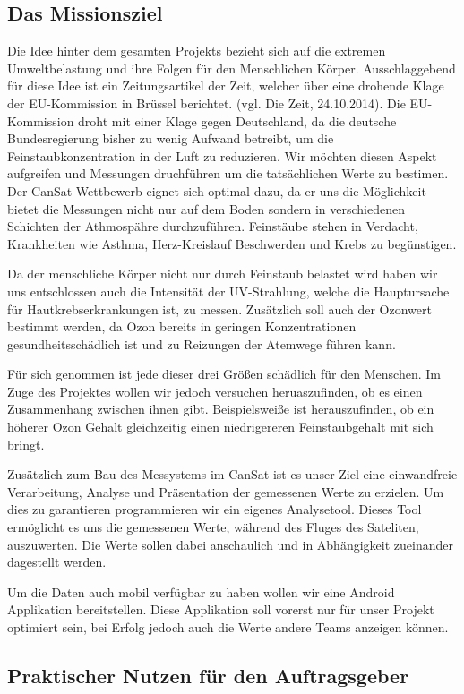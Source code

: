 \subsection{Das Missionsziel}

Die Idee hinter dem gesamten Projekts bezieht sich auf die extremen Umweltbelastung und ihre Folgen für den Menschlichen Körper. Ausschlaggebend für diese Idee ist ein Zeitungsartikel der Zeit, welcher über eine drohende Klage der EU-Kommission in Brüssel berichtet. (vgl. Die Zeit, 24.10.2014). Die EU-Kommission droht mit einer Klage gegen Deutschland, da die deutsche Bundesregierung bisher zu wenig Aufwand betreibt, um die Feinstaubkonzentration in der Luft zu reduzieren. Wir möchten diesen Aspekt aufgreifen und Messungen druchführen um die tatsächlichen Werte zu bestimen. Der CanSat Wettbewerb eignet sich optimal dazu, da er uns die Möglichkeit bietet die Messungen nicht nur auf dem Boden sondern in verschiedenen Schichten der Athmospähre durchzuführen. Feinstäube stehen in Verdacht, Krankheiten wie Asthma, Herz-Kreislauf Beschwerden und Krebs zu begünstigen.

Da der menschliche Körper nicht nur durch Feinstaub belastet wird haben wir uns entschlossen auch die Intensität der UV-Strahlung, welche die Hauptursache für Hautkrebserkrankungen ist, zu messen. Zusätzlich soll auch der Ozonwert bestimmt werden, da Ozon bereits in geringen Konzentrationen gesundheitsschädlich ist und zu Reizungen der Atemwege führen kann.

Für sich genommen ist jede dieser drei Größen schädlich für den Menschen. Im Zuge des Projektes wollen wir jedoch versuchen heruaszufinden, ob es einen Zusammenhang zwischen ihnen gibt. Beispielsweiße ist herauszufinden, ob ein höherer Ozon Gehalt gleichzeitig einen niedrigereren Feinstaubgehalt mit sich bringt.

Zusätzlich zum Bau des Messystems im CanSat ist es unser Ziel eine einwandfreie Verarbeitung, Analyse und Präsentation der gemessenen Werte zu erzielen. Um dies zu garantieren programmieren wir ein eigenes Analysetool. Dieses Tool ermöglicht es uns die gemessenen Werte, während des Fluges des Sateliten, auszuwerten. Die Werte sollen dabei anschaulich und in Abhängigkeit zueinander dagestellt werden.

Um die Daten auch mobil verfügbar zu haben wollen wir eine Android Applikation bereitstellen. Diese Applikation soll vorerst nur für unser Projekt optimiert sein, bei Erfolg jedoch auch die Werte andere Teams anzeigen können.

\subsection{Praktischer Nutzen für den Auftragsgeber}



